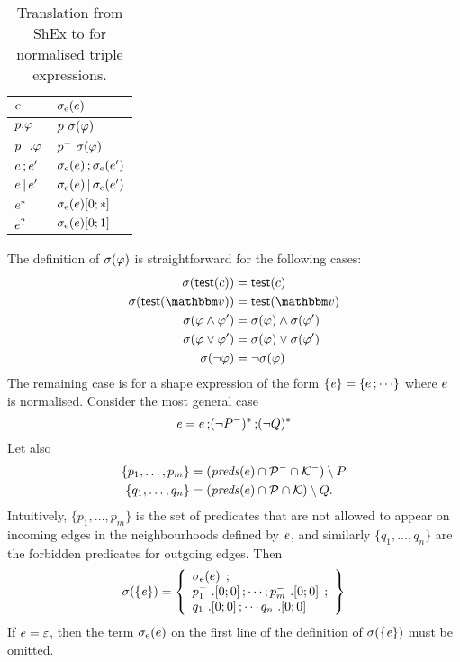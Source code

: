 \begin{table}[ht]
\caption{\label{tab:app-shex-translation-to-standard}%
  Translation from ShEx to \stshex for normalised triple expressions.}
\centering
\begin{tabular}{ll}
\toprule
  $e$                  & $\sigma_{\text{e}}(e)$ \\
\midrule
  $p.\mathit{\varphi}$                 & $p\ \trtost{\se}$\\
  $p^{-}.\mathit{\varphi}$   & $p^{-}\ \sigma(\mathit{\varphi})$\\
  $e \mathop{;} e'$  & $\sigma_{\text{e}}(e) \mathop{;} \sigma_{\text{e}}(e')$\\
  $e \mathop{|} e'$   & $\sigma_{\text{e}}(e) \mathop{|} \sigma_{\text{e}}(e')$\\
  $e^{*}$              & $\sigma_{\text{e}}(e)[0;*]$\\
  $e^{?}$              & $\sigma_{\text{e}}(e)[0;1]$\\
\bottomrule
\end{tabular}
\end{table}

The definition of $\sigma(\mathit{\varphi})$ is straightforward for the following cases:
\begin{align*}
  \trtost{\shexhasvalue(c)}
& =
  \shexhasvalue(c) \\
  \trtost{\shextest(\vtype)}
& =
  \shextest(\vtype) \\
  \trtost{\se \land \se'}
& =
  \trtost{\se} \land \trtost{\se'} \\
  \trtost{\se \lor \se'}
& =
  \trtost{\se} \lor \trtost{\se'} \\
  \trtost{\neg \se}
& =
  \neg \trtost{\se}
\end{align*}
The remaining case is for a shape expression of the form $\left\{ \mathit{e} \right\} =
\left\{ e \mathop{;} \cdots \right\}$ where $e$ is normalised.
Consider the most general case
\[
  \mathit{e}
=
  e \mathop{;} (\neg{P^{-}})^{*} \mathop{;} (\neg Q)^{*}
\]
Let also
\begin{align*}
  \{ p_1, \ldots, p_m \}
& =
  (\mathit{preds}(e) \cap \mathcal{P}^{-} \cap \mathcal{K}^{-}) \setminus P \\
  \{ q_1, \ldots, q_n \}
& =
  (\mathit{preds}(e) \cap \mathcal{P} \cap \mathcal{K}) \setminus Q.
\end{align*}
Intuitively, $\{ p_1, \ldots, p_m \}$ is the set of predicates that are not
allowed to appear on incoming edges in the neighbourhoods defined by $\mathit{e}$, and
similarly $\{q_1, \ldots, q_n\}$ are the forbidden predicates for outgoing
edges.
Then
\[
  \sigma(\left\{ \mathit{e} \right\})
=
  \left\{
  \begin{array}{l}
    \sigma_{\text{e}}(e) \;\mathop{;} \\
    p_1^{-}\ .[0;0] \mathop{;} \cdots \mathop{;} p_m^{-}\
    .[0;0] \;\mathop{;} \\
    q_1\ .[0;0] \mathop{;} \cdots q_n\ .[0;0]
  \end{array}
  \right\}
\]
If $e = \varepsilon$, then the term $\sigma_{\text{e}}(e)$ on the first line of
the definition of $\sigma(\left\{ \mathit{e} \right\})$ must be omitted.

